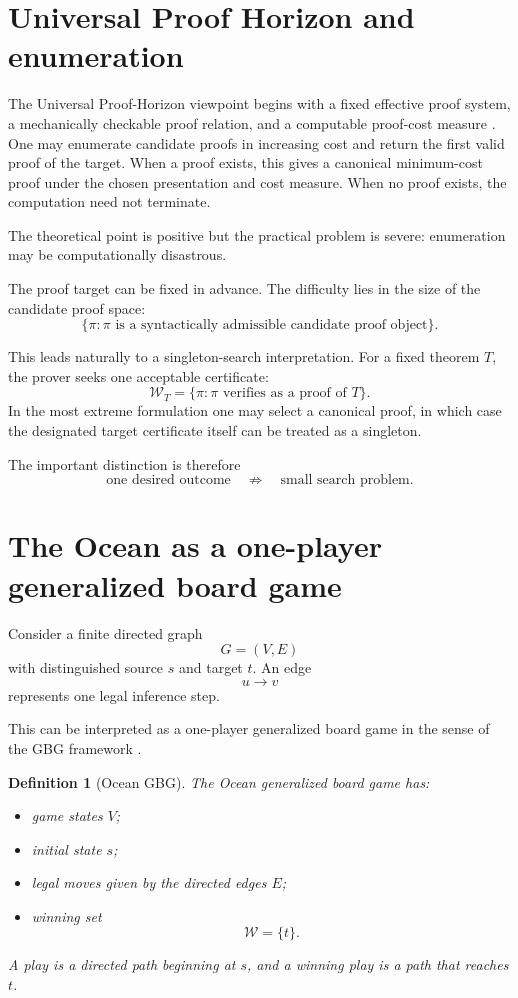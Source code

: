 \documentclass[11pt]{article}
\newtheorem{definition}{Definition}
\newcommand{\Wset}{\mathcal{W}}
\begin{document}
\section{Universal Proof Horizon and enumeration}

The Universal Proof-Horizon viewpoint begins with a fixed effective proof
system, a mechanically checkable proof relation, and a computable proof-cost
measure \cite{tenneson-uph}. One may enumerate candidate proofs in increasing cost and return the
first valid proof of the target. When a proof exists, this gives a canonical
minimum-cost proof under the chosen presentation and cost measure. When no
proof exists, the computation need not terminate.

The theoretical point is positive but the practical problem is severe:
enumeration may be computationally disastrous.

The proof target can be fixed in advance. The difficulty lies in the size of
the candidate proof space:
\[
\{\pi : \pi \text{ is a syntactically admissible candidate proof object}\}.
\]

This leads naturally to a singleton-search interpretation. For a fixed
theorem \(T\), the prover seeks one acceptable certificate:
\[
\Wset_T
=
\{\pi : \pi \text{ verifies as a proof of }T\}.
\]
In the most extreme formulation one may select a canonical proof, in which
case the designated target certificate itself can be treated as a singleton.

The important distinction is therefore
\[
\text{one desired outcome}
\quad\not\Rightarrow\quad
\text{small search problem}.
\]

\section{The Ocean as a one-player generalized board game}

Consider a finite directed graph
\[
G=(V,E)
\]
with distinguished source \(s\) and target \(t\). An edge
\[
u\to v
\]
represents one legal inference step.

This can be interpreted as a one-player generalized board game in the sense of the GBG framework \cite{tenneson-gbg}.

\begin{definition}[Ocean GBG]
The Ocean generalized board game has:
\begin{itemize}[leftmargin=2em]
    \item game states \(V\);
    \item initial state \(s\);
    \item legal moves given by the directed edges \(E\);
    \item winning set
    \[
    \Wset=\{t\}.
    \]
\end{itemize}
A play is a directed path beginning at \(s\), and a winning play is a path that
reaches \(t\).
\end{definition}
\end{document}

